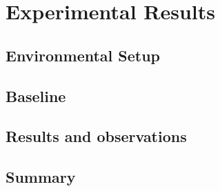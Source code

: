 \chapter{Experimental Results}
\lipsum[1]

\section{Environmental Setup}
\lipsum[1]

\section{Baseline}
\lipsum[1]

\section{Results and observations}
\lipsum[1-2]

\section{Summary}
\lipsum[1-2]

